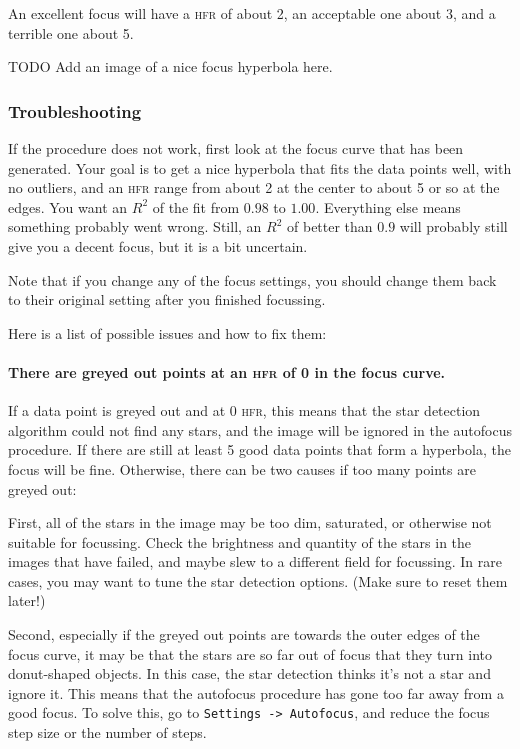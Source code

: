 \documentclass[a4paper, 11pt, fleqn]{memoir}
\begin{document}
An excellent focus will have a \textsc{hfr} of about 2, an acceptable one about 3, and a terrible one about 5.

TODO Add an image of a nice focus hyperbola here.

\subsubsection*{Troubleshooting}
If the procedure does not work, first look at the focus curve that has been generated.
Your goal is to get a nice hyperbola that fits the data points well, with no outliers, and an \textsc{hfr} range from about 2 at the center to about 5 or so at the edges.
You want an $R^2$ of the fit from $0.98$ to $1.00$.
Everything else means something probably went wrong.
Still, an $R^2$ of better than $0.9$ will probably still give you a decent focus, but it is a bit uncertain.

Note that if you change any of the focus settings, you should change them back to their original setting after you finished focussing.

Here is a list of possible issues and how to fix them:

\paragraph*{There are greyed out points at an \textsc{hfr} of 0 in the focus curve.
}
If a data point is greyed out and at 0 \textsc{hfr}, this means that the star detection algorithm could not find any stars, and the image will be ignored in the autofocus procedure.
If there are still at least 5 good data points that form a hyperbola, the focus will be fine.
Otherwise, there can be two causes if too many points are greyed out:

First, all of the stars in the image may be too dim, saturated, or otherwise not suitable for focussing.
Check the brightness and quantity of the stars in the images that have failed, and maybe slew to a different field for focussing.
In rare cases, you may want to tune the star detection options.
(Make sure to reset them later!)

Second, especially if the greyed out points are towards the outer edges of the focus curve, it may be that the stars are so far out of focus that they turn into donut-shaped objects.
In this case, the star detection thinks it's not a star and ignore it.
This means that the autofocus procedure has gone too far away from a good focus.
To solve this, go to \texttt{Settings -> Autofocus}, and reduce the focus step size or the number of steps.
\end{document}
